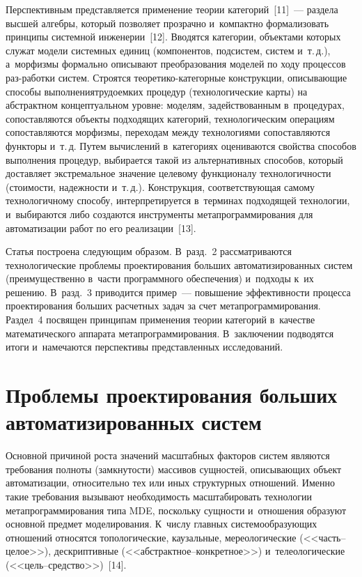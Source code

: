 \begin{multicols}{2}
   Перспективным представляется применение тео\-рии категорий~[11]~--- 
раздела высшей алгебры, который позволяет прозрачно и~компактно 
формализовать принципы системной инженерии~[12]. Вводятся категории, 
объектами которых служат модели системных единиц (компонентов, 
подсистем, систем и~т.\,д.), а~морфизмы формально описыва\-ют преобразования 
моделей по ходу процессов раз-\linebreak работки систем. Строятся  
тео\-ре\-ти\-ко-ка\-те\-гор\-ные конструкции, описывающие способы 
выполнения\linebreak трудоемких процедур (технологические карты) на абстрактном 
концептуальном уровне: моделям, задействованным в~процедурах, 
сопоставляются объекты подходящих категорий, технологическим операциям 
сопоставляются морфизмы, переходам между технологиями сопоставляются 
функторы и~т.\,д. Путем вычислений в~категориях оценива\-ются свойства 
способов выполнения процедур, выбирается такой из альтернативных 
способов, который доставляет экстремальное значение целевому функционалу 
технологичности (стоимости, надежности и~т.\,д.). Конструкция, 
соответствующая самому технологичному способу, интерпретируется 
в~терминах подходящей технологии, и~выбираются либо создаются 
инструменты метапрограммирования для автоматизации работ по его 
реализации~[13].
   
   Статья построена следующим образом. В~разд.~2 рассматриваются 
технологические проблемы проектирования больших автоматизированных 
систем (преимущественно в~части программного обеспечения) и~подходы к~их 
решению. В~разд.~3 приводится пример~--- повышение эффективности 
процесса проектирования больших расчетных задач за счет 
метапрограммирования. Раздел~4 посвящен принципам применения теории 
категорий в~качестве математического аппарата метапрограммирования. 
В~заключении подводятся итоги и~намечаются перспективы представленных 
исследований.

\vspace*{-6pt}

\section{Проблемы проектирования больших автоматизированных 
систем}

\vspace*{-2pt}
   
   Основной причиной роста значений масштабных факторов систем являются 
требования полноты (замкнутости) массивов сущностей, опи\-сы\-ва\-ющих объект 
автоматизации, относительно тех или иных структурных отношений. Именно 
такие требования вызывают необходимость масштабировать технологии 
метапрограммирования типа MDE, поскольку сущности и~отношения образуют 
основной предмет моделирования. К~числу главных сис\-те\-мо\-об\-ра\-зу\-ющих 
отношений относятся топологические, каузальные, мереологические  
(<<часть--це\-лое>>), дескриптивные (<<абст\-ракт\-ное--кон\-крет\-ное>>) 
и~телеологические (<<цель--сред\-ст\-во>>)~[14].
   

\end{multicols}
